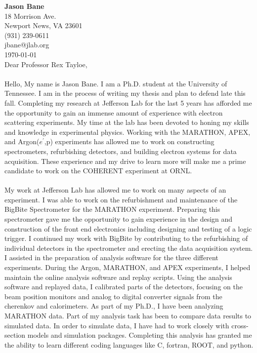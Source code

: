 \documentclass[12pt,letterpaper]{article}
\newcommand{\CPP}
{C\nolinebreak[4]\hspace{-.05em}\raisebox{.22ex}{\footnotesize\bf ++}}
\begin{document}
\vspace*{-1.2cm}
{\textbf{Jason Bane}}\\
18 Morrison Ave. \\
Newport News, VA 23601 \\
(931) 239-0611 \\
jbane@jlab.org \\
\today\\

Dear Professor Rex Tayloe, 

\paragraph{}Hello, My name is Jason Bane. I am a Ph.D. student at the University of Tennessee. I am in the process of writing my thesis and plan to defend late this fall. Completing my research at Jefferson Lab for the last 5 years has afforded me the opportunity to gain an immense amount of experience with electron scattering experiments. My time at the lab has been devoted to honing my skills and knowledge in experimental physics. Working with the MARATHON, APEX, and Argon($e^\prime$,p) experiments has allowed me to work on constructing spectrometers, refurbishing detectors, and building electron systems for data acquisition. These experience and my drive to learn more will make me a prime candidate to work on the COHERENT experiment at ORNL.
\paragraph{}My work at Jefferson Lab has allowed me to work on many aspects of an experiment. I was able to work on the refurbishment and maintenance of the BigBite Spectrometer for the MARATHON experiment. Preparing this spectrometer gave me the opportunity to gain experience in the design and construction of the front end electronics including designing and testing of a logic trigger. I continued my work with BigBite by contributing to the refurbishing of individual detectors in the spectrometer and erecting the data acquisition system. I assisted in the preparation of analysis software for the three different experiments. During the Argon, MARATHON, and APEX experiments, I helped maintain the online analysis software and replay scripts. Using the analysis software and replayed data, I calibrated parts of the detectors, focusing on the beam position monitors and analog to digital converter signals from the cherenkov and calorimeters. As part of my Ph.D., I have been analyzing MARATHON data. Part of my analysis task has been to compare data results to simulated data. In order to simulate data, I have had to work closely with cross-section models and simulation packages. Completing this analysis has granted me the ability to learn different coding languages like \CPP, fortran, ROOT, and python.
\end{document}
